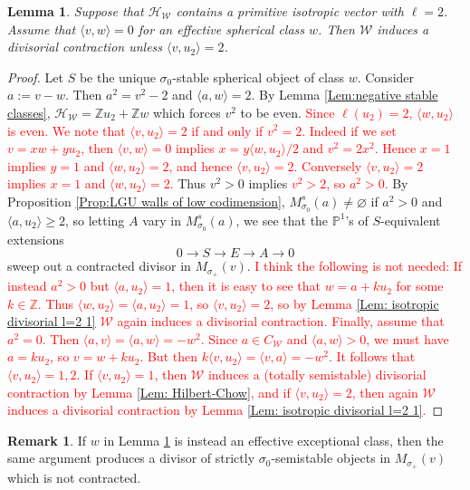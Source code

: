 \documentclass[leqno,11pt]{amsart}
\def\P{\ensuremath{\mathbb{P}}}
\def\Z{\ensuremath{\mathbb{Z}}}
\newtheorem{Lem}[Thm]{Lemma}
\theoremstyle{definition}
\newtheorem{Rem}[Thm]{Remark}
\def\P{\ensuremath{\mathbb{P}}}
\def\Z{\ensuremath{\mathbb{Z}}}
\def\HH{\ensuremath{\mathcal H}}
\def\WW{\ensuremath{\mathcal W}}
\begin{document}
\begin{Lem}\label{Lem: isotropic divisorial l=2 2}
Suppose that $\HH_{\WW}$ contains a primitive isotropic vector with $\ell=2$.  Assume that $\langle v,w\rangle=0$ for an effective spherical class $w$. 
Then $\WW$ induces a divisorial contraction unless $\langle v,u_2 \rangle=2$.
\end{Lem}
\begin{proof}
Let $S$ be the unique $\sigma_0$-stable spherical object of class $w$.  Consider $a:=v-w$.  Then $a^2=v^2-2$ and $\langle a,w\rangle=2$.  By Lemma \ref{Lem:negative stable classes}, $\HH_\WW=\Z u_2+\Z w$ which forces $v^2$ to be even.  
\textcolor{red}{Since $\ell(u_2)=2$, $\langle w,u_2 \rangle$ is even. We note that 
$\langle v,u_2 \rangle=2$ if and only if $v^2=2$.
Indeed if we set $v=xw+yu_2$, then $\langle v,w \rangle=0$ implies $x=y \langle w,u_2 \rangle/2$
and $v^2=2x^2$. Hence $x=1$ implies $y=1$ and $\langle w,u_2 \rangle=2$, and hence $\langle v,u_2 \rangle=2$. Conversely $\langle v,u_2 \rangle=2$ implies $x=1$ and $\langle w,u_2 \rangle=2$.}
Thus $v^2>0$ implies \textcolor{red}{$v^2> 2$, so $a^2> 0$.}
By Proposition \ref{Prop:LGU walls of low codimension}, $M_{\sigma_0}^s(a)\neq\varnothing$ if $a^2>0$ and $\langle a,u_2\rangle\geq 2$, so letting $A$ vary in $M^s_{\sigma_0}(a)$, we see that the $\P^1$'s of $S$-equivalent extensions $$0\to S\to E\to A\to 0$$ sweep out a contracted divisor in $M_{\sigma_+}(v)$.
\textcolor{red}{
I think the following is not needed:
If instead $a^2>0$ but $\langle a,u_2\rangle=1$, then it is easy to see that $w=a+ku_2$ for some $k\in \Z$.  Thus $\langle w,u_2\rangle=\langle a,u_2\rangle=1$, so $\langle v,u_2\rangle=2$, so by Lemma \ref{Lem: isotropic divisorial l=2 1} $\WW$ again induces a divisorial contraction.  
Finally, assume that $a^2=0$.  Then $\langle a,v\rangle=\langle a,w\rangle=-w^2$.  Since $a\in C_{\WW}$ and $\langle a,w\rangle>0$, we must have $a=ku_2$, so $v=w+ku_2$.  But then $k\langle v,u_2\rangle=\langle v,a\rangle=-w^2$.  It follows that $\langle v,u_2\rangle=1,2$.  
If $\langle v,u_2\rangle=1$, then $\WW$ induces a (totally semistable) divisorial contraction by Lemma \ref{Lem: Hilbert-Chow}, and if $\langle v,u_2\rangle=2$, then again $\WW$ induces a divisorial contraction by Lemma \ref{Lem: isotropic divisorial l=2 1}.}
\end{proof}
\begin{Rem}
If $w$ in Lemma \ref{Lem: isotropic divisorial l=2 2} is instead an effective exceptional class, then the same argument produces a divisor of strictly $\sigma_0$-semistable objects in $M_{\sigma_+}(v)$ which is not contracted. 
\end{Rem}
\end{document}
